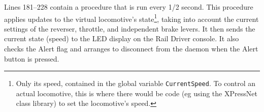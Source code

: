 Lines 181--228 contain a procedure that is run every 1/2 second.  This
procedure applies updates to the virtual locomotive's
state\footnote{Only its speed, contained in the global variable
\texttt{CurrentSpeed}. To control an actual locomotive, this is where
there would be code (eg using the XPressNet class library) to set the
locomotive's speed.}, taking into account the current settings of the
reverser, throttle, and independent brake levers. It then sends the
current state (speed) to the LED display on the Rail Driver console. It
also checks the Alert flag and arranges to disconnect from the daemon
when the Alert button is pressed.


